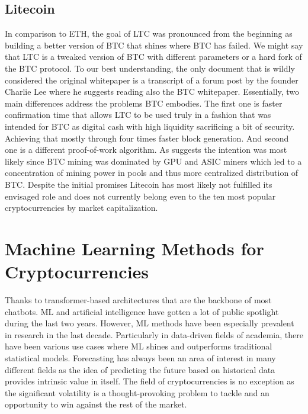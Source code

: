 \subsection{Litecoin}
In comparison to \ac{ETH}, the goal of \ac{LTC} was pronounced from the 
beginning as building a better version of \ac{BTC} that shines where
\ac{BTC} has failed. We might say that \ac{LTC} is a tweaked version of \ac{BTC} with 
different parameters or a hard fork of the \ac{BTC} protocol. 
To our best understanding, the only document that 
is wildly considered the original whitepaper is a transcript of a forum
post by the founder Charlie Lee where he suggests reading 
also the \ac{BTC} whitepaper.
Essentially, two main differences address the problems
\ac{BTC} embodies. The first one is faster confirmation time that allows 
\ac{LTC} to be used truly in a fashion that was intended for \ac{BTC} as 
digital cash with high liquidity sacrificing a bit of security. Achieving
that mostly through four times faster block generation. And second one 
is a different proof-of-work algorithm. As \cite{Padmavathi2018} suggests
the intention was most likely since \ac{BTC} mining
was dominated by GPU and ASIC miners which led to a concentration of mining power
in pools and thus more centralized distribution of \ac{BTC}. Despite the initial
promises Litecoin has most likely not fulfilled its envisaged role
and does not currently belong even to the ten most popular cryptocurrencies
by market capitalization.


\section{Machine Learning Methods for Cryptocurrencies}
\label{sec:ml}
Thanks to transformer-based architectures that are the backbone 
of most chatbots. \ac{ML} and artificial intelligence have gotten a lot
of public spotlight during the last two years. However, \ac{ML} methods
have been especially prevalent in research in the last decade.
Particularly in data-driven fields of academia, there have been various
use cases where \ac{ML} shines and outperforms traditional statistical models.
Forecasting has always been an area of interest in many different fields
as the idea of predicting the future based on historical data 
provides intrinsic value in itself.
The field of cryptocurrencies is no exception as the significant volatility
is a thought-provoking problem to tackle and an opportunity to 
win against the rest of the market.


